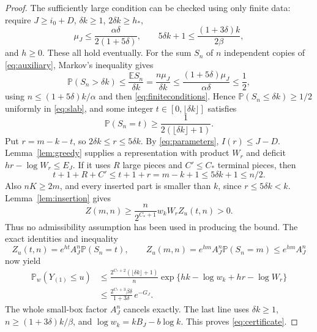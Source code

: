 \documentclass[11pt]{amsart}
\theoremstyle{remark}\newtheorem{remark}[theorem]{Remark}
\newcommand{\Pp}{\mathbb P}
\newcommand{\E}{\mathbb E}
\begin{document}
\begin{proof}
The sufficiently large condition can be checked using only finite data:
require $J\ge i_0+D$, $\delta k\ge1$, $2\delta k\ge h_*$,
\begin{equation}\label{eq:finiteconditions}
 \mu_J\le\frac{\alpha\delta}{2(1+5\delta)},\qquad
 5\delta k+1\le\frac{(1+3\delta)k}{2\beta},
\end{equation}
and $h\ge0$. These all hold eventually. For the sum $S_n$ of $n$
independent copies of \eqref{eq:auxiliary}, Markov's inequality gives
\[
 \Pp(S_n>\delta k)\le\frac{\E S_n}{\delta k}=\frac{n\mu_J}{\delta k}
 \le\frac{(1+5\delta)\mu_J}{\alpha\delta}\le\frac12,
\]
using $n\le(1+5\delta)k/\alpha$ and then \eqref{eq:finiteconditions}. Hence
$\Pp(S_n\le\delta k)\ge1/2$ uniformly in \eqref{eq:slab}, and some integer
$t\in[0,\lfloor\delta k\rfloor]$ satisfies
\begin{equation}\label{eq:atom}
 \Pp(S_n=t)\ge\frac1{2(\lfloor\delta k\rfloor+1)}.
\end{equation}
Put $r=m-k-t$, so $2\delta k\le r\le5\delta k$. By
\eqref{eq:parameters}, $I(r)\le J-D$. Lemma~\ref{lem:greedy} supplies a
representation with product $W_r$ and deficit $hr-\log W_r\le E_J$.
If it uses $R$ large pieces and $C'\le C_*$ terminal pieces, then
\[
 t+1+R+C'\le t+1+r=m-k+1\le5\delta k+1\le n/2.
\]
Also $nK\ge2m$, and every inserted part is smaller than $k$, since
$r\le5\delta k<k$. Lemma~\ref{lem:insertion} gives
\[
 Z(m,n)\ge\frac{n}{2^{C_*+1}}w_kW_r Z_u(t,n)>0.
\]
Thus no admissibility assumption has been used in producing the bound.
The exact identities and inequality
\[
 Z_u(t,n)=e^{ht}A_J^n\Pp(S_n=t),\qquad
 Z_u(m,n)=e^{hm}A_J^n\Pp(S_n=m)\le e^{hm}A_J^n
\]
now yield
\begin{align*}
 \Pp_w(Y_{(1)}\le u)
 &\le\frac{2^{C_*+2}(\lfloor\delta k\rfloor+1)}n
       \exp\{hk-\log w_k+hr-\log W_r\}\\
 &\le\frac{2^{C_*+3}\beta\delta}{1+3\delta}\,e^{-G_J}.
\end{align*}
The whole small-box factor $A_J^n$ cancels exactly. The last line uses
$\delta k\ge1$, $n\ge(1+3\delta)k/\beta$, and
$\log w_k=kB_J-b\log k$. This proves \eqref{eq:certificate}.
\end{proof}
\end{document}
